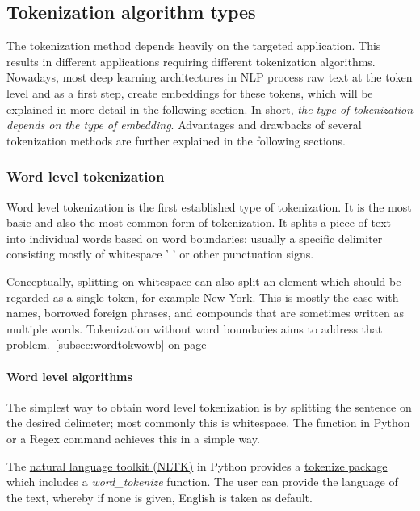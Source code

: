 \subsection{Tokenization algorithm types}

The tokenization method depends heavily on the targeted application. This results in different applications requiring different tokenization algorithms. Nowadays, most deep learning architectures in NLP process raw text at the token level and as a first step, create embeddings for these tokens, which will be explained in more detail in the following section. In short, \textit{the type of tokenization depends on the type of embedding}. Advantages and drawbacks of several tokenization methods are further explained in the following sections.

\subsubsection{Word level tokenization}

Word level tokenization is the first established type of tokenization. It is the most basic and also the most common form of tokenization. It splits a piece of text into individual words based on word boundaries; usually a specific delimiter consisting mostly of whitespace ' ' or other punctuation signs.

Conceptually, splitting on whitespace can also split an element which should be regarded as a single token, for example New York. This is mostly the case with names, borrowed foreign phrases, and compounds that are sometimes written as multiple words. Tokenization without word boundaries aims to address that problem.~\ref{subsec:wordtokwowb} on page~\pageref{subsec:wordtokwowb}

\paragraph{Word level algorithms}

The simplest way to obtain word level tokenization is by splitting the sentence on the desired delimeter; most commonly this is whitespace. The  function in Python or a Regex command  achieves this in a simple way.

The \href{https://www.nltk.org/}{natural language toolkit (NLTK)} in Python provides a \href{https://www.nltk.org/api/nltk.tokenize.html}{tokenize package} which includes a \emph{word\_tokenize} function. The user can provide the language of the text, whereby if none is given, English is taken as default.

